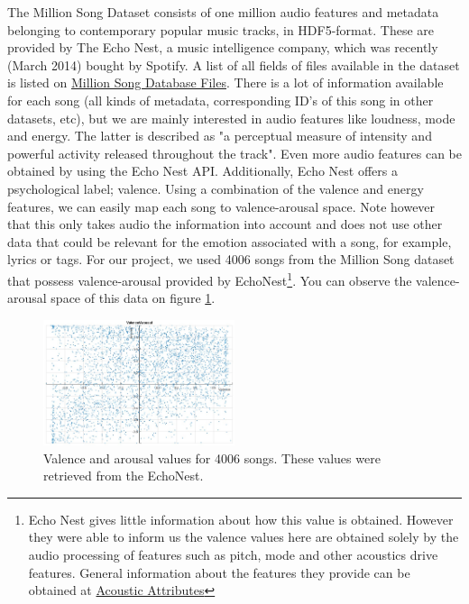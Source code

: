 \documentclass[10pt,journal,compsoc]{IEEEtran}
\begin{document}
The Million Song Dataset consists of one million audio features and metadata belonging to contemporary popular music tracks, in HDF5-format. These are provided by The Echo Nest, a music intelligence company, which was recently (March 2014) bought by Spotify. A list of all fields of files available in the dataset is listed on \href{http://labrosa.ee.columbia.edu/millionsong/pages/field-list}{Million Song Database Files}. There is a lot of information available for each song (all kinds of metadata, corresponding ID's of this song in other datasets, etc), but we are mainly interested in audio features like loudness, mode and energy. The latter is described as "a perceptual measure of intensity and powerful activity released throughout the track". Even more audio features can be obtained by using the Echo Nest API. Additionally, Echo Nest offers a psychological label; valence. Using a combination of the valence and energy features, we can easily map each song to valence-arousal space. Note however that this only takes audio the information into account and does not use other data that could be relevant for the emotion associated with a song, for example, lyrics or tags. For our project, we used 4006 songs from the Million Song dataset that possess valence-arousal provided by EchoNest\footnote{Echo Nest gives little information about how this value is obtained. However they were able to inform us the valence values here are obtained solely by the audio processing of features such as pitch, mode and other acoustics drive features. General information about the features they provide can be obtained at \href{http://developer.echonest.com/acoustic-attributes.html}{Acoustic Attributes}}. You can observe the valence-arousal space of this data on figure \ref{fig:songva}.

\begin{figure}[h!]
	\centering
	\includegraphics[width=0.5\textwidth]{"SongVA"}
	\caption{Valence and arousal values for 4006 songs. These values were retrieved from the EchoNest.}
	\label{fig:songva}
\end{figure}
\end{document}
